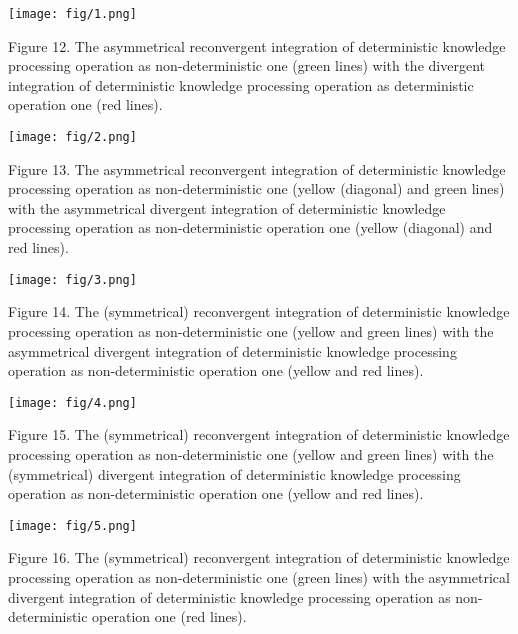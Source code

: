 \documentclass{article}
\begin{document}
\begin{multicols}{2}

\begin{center}
\texttt{[image: fig/1.png]}
\end{center}
\vspace{0.5pt}
\scriptsize Figure 12. The asymmetrical reconvergent integration of deterministic
knowledge processing operation as non-deterministic one (green lines)
with the divergent integration of deterministic knowledge processing
operation as deterministic operation one (red lines).

\begin{center}
\texttt{[image: fig/2.png]}
\end{center}
\vspace{0.5pt}
\scriptsize Figure 13. The asymmetrical reconvergent integration of deterministic
knowledge processing operation as non-deterministic one (yellow
(diagonal) and green lines) with the asymmetrical divergent integration
of deterministic knowledge processing operation as non-deterministic
operation one (yellow (diagonal) and red lines).

\begin{center}
\texttt{[image: fig/3.png]}
\end{center}
\vspace{0.5pt}
\scriptsize Figure 14. The (symmetrical) reconvergent integration of deterministic
knowledge processing operation as non-deterministic one (yellow and
green lines) with the asymmetrical divergent integration of deterministic
knowledge processing operation as non-deterministic operation one
(yellow and red lines).


\begin{center}
\texttt{[image: fig/4.png]}
\end{center}
\vspace{0.5pt}
\scriptsize Figure 15. The (symmetrical) reconvergent integration of deterministic
knowledge processing operation as non-deterministic one (yellow and
green lines) with the (symmetrical) divergent integration of deterministic
knowledge processing operation as non-deterministic operation one
(yellow and red lines).


\begin{center}
\texttt{[image: fig/5.png]}
\end{center}
\vspace{0.5pt}
\scriptsize Figure 16. The (symmetrical) reconvergent integration of deterministic
knowledge processing operation as non-deterministic one (green lines)
with the asymmetrical divergent integration of deterministic knowledge
processing operation as non-deterministic operation one (red lines).


\end{multicols}
\end{document}

